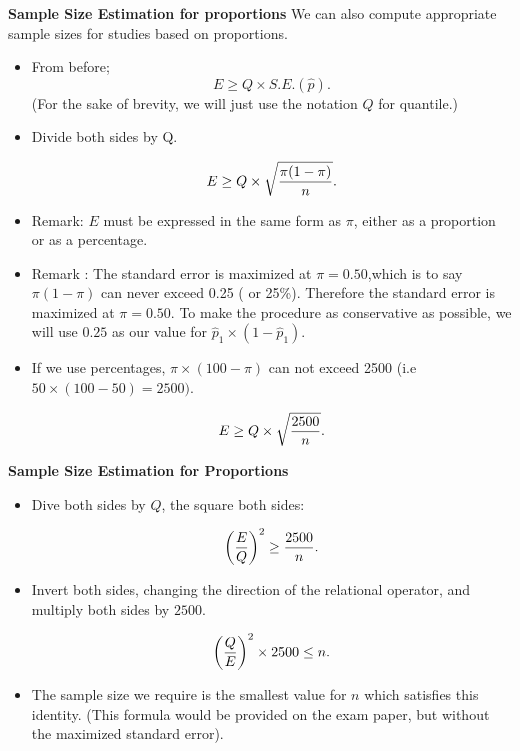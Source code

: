 
\noindent \textbf{Sample Size Estimation for proportions}
We can also compute appropriate sample sizes for studies based on proportions.
\begin{itemize}
\item From before; \[ E \geq Q \times S.E.(\hat{p}). \]
(For the sake of brevity, we will just use the notation $Q$ for quantile.)

\item Divide both sides by Q.

\[ E \geq Q \times \sqrt{ {\pi(1-\pi)  \over n} }. \]

\end{itemize}


\begin{itemize}
\item Remark: $E$ must be expressed in the same form as $\pi$, either as a proportion or as a percentage.
\item Remark : The standard error is maximized at $\pi = 0.50$,which is to say $\pi(1-\pi)$ can never exceed 0.25 ( or 25\%). Therefore the standard error is maximized at $\pi = 0.50$. To make the procedure as conservative as possible, we will use $0.25$ as our value for $\hat{p}_1 \times (1 - \hat{p}_1)$.
\item If we use percentages, $\pi \times (100-\pi)$ can not exceed 2500 (i.e $ 50 \times (100-50)=2500)$.

\[ E \geq Q \times \sqrt{{2500 \over n}}. \]


\end{itemize}



\noindent \textbf{Sample Size Estimation for Proportions}

\begin{itemize}

\item Dive both sides by $Q$, the square both sides:

\[ \left({E\over Q}\right)^2 \geq {2500 \over n}. \]

\item Invert both sides, changing the direction of the relational operator, and multiply both sides by $2500$.

\[ \left({Q\over E}\right)^2 \times 2500 \leq n. \]

\item The sample size we require is the smallest value for $n$ which satisfies this identity. (This formula would be provided on the exam paper, but without the maximized standard error).
\end{itemize}





